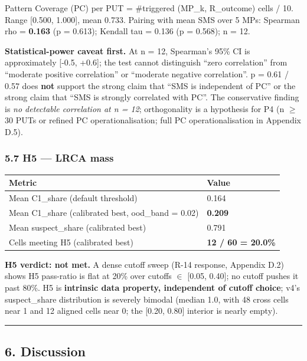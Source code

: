 \documentclass[review,12pt,authoryear]{elsarticle}
\newcounter{none}                   %
\begin{document}
Pattern Coverage (PC) per PUT = \#triggered (MP\_k, R\_outcome) cells /
10. Range {[}0.500, 1.000{]}, mean 0.733. Pairing with mean SMS over 5
MPs: Spearman rho = \textbf{0.163} (p = 0.613); Kendall tau = 0.136 (p =
0.568); n = 12.

\textbf{Statistical-power caveat first.} At n = 12, Spearman's 95\% CI
is approximately {[}-0.5, +0.6{]}; the test cannot distinguish ``zero
correlation'' from ``moderate positive correlation'' or ``moderate
negative correlation''. p = 0.61 / 0.57 does \textbf{not} support the
strong claim that ``SMS is independent of PC'' or the strong claim that
``SMS is strongly correlated with PC''. The conservative finding is
\emph{no detectable correlation at n = 12}; orthogonality is a
hypothesis for P4 (n $\geq$ 30 PUTs or refined PC operationalisation; full PC
operationalisation in Appendix D.5).

\subsubsection{5.7 H5 --- LRCA mass}\label{h5-lrca-mass}

{\def\LTcaptype{none} %
\begin{longtable}[]{@{}ll@{}}
\toprule\noalign{}
Metric & Value \\
\midrule\noalign{}
\endhead
\bottomrule\noalign{}
\endlastfoot
Mean C1\_share (default threshold) & 0.164 \\
Mean C1\_share (calibrated best, ood\_band = 0.02) & \textbf{0.209} \\
Mean suspect\_share (calibrated best) & 0.791 \\
Cells meeting H5 (calibrated best) & \textbf{12 / 60 = 20.0\%} \\
\end{longtable}
}

\textbf{H5 verdict: not met.} A dense cutoff sweep (R-14 response,
Appendix D.2) shows H5 pass-ratio is flat at 20\% over cutoffs $\in$
{[}0.05, 0.40{]}; no cutoff pushes it past 80\%. H5 is \textbf{intrinsic
data property, independent of cutoff choice}; v4's suspect\_share
distribution is severely bimodal (median 1.0, with 48 cross cells near 1
and 12 aligned cells near 0; the {[}0.20, 0.80{]} interior is nearly
empty).

\begin{center}\rule{0.5\linewidth}{0.5pt}\end{center}

\subsection{6. Discussion}\label{discussion}
\end{document}
